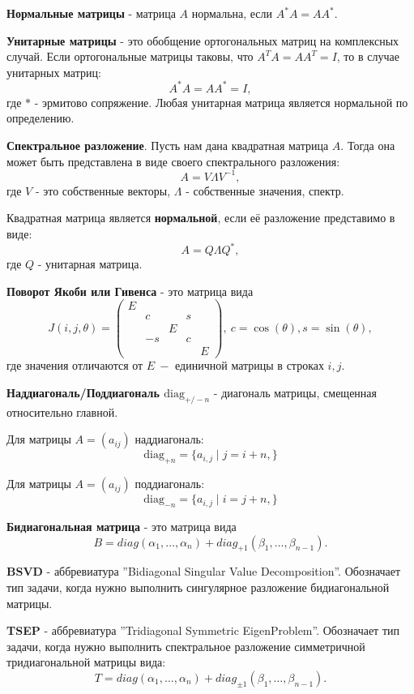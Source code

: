 \textbf{Нормальные матрицы} - матрица \(A\) нормальна, если \(A^*A=AA^*\).

\textbf{Унитарные матрицы} - это обобщение ортогональных матриц на комплексных случай. Если ортогональные матрицы таковы, что \(A^TA=AA^T=I\), то в случае унитарных матриц:
\[A^*A=AA^*=I,\]
где \(*\) - эрмитово сопряжение. Любая унитарная матрица является нормальной по определению.

\textbf{Спектральное разложение}. Пусть нам дана квадратная матрица \(A\). Тогда она может быть представлена в виде своего спектрального разложения:
\[ A=V\Lambda V^{-1},\]
 где \(V\) - это собственные векторы, \(\Lambda\) - собственные значения, спектр.

Квадратная матрица является \textbf{нормальной}, если её разложение представимо в виде:
\[A=Q \Lambda Q^*,\]
где \(Q\) - унитарная матрица. 

\textbf{Поворот Якоби или Гивенса} - это матрица вида
\[ \label{eq:2:1}
    J(i,j,\theta) = 
    \begin{pmatrix}E&&&&\\
        &c&&s\\
        &&E&&\\
        &-s&&c\\
        &&&&E
    \end{pmatrix},\
    c = \cos(\theta), s =\sin(\theta), 
\]
где значения отличаются от \(E\ - \) единичной матрицы в строках \(i, j\).

\textbf{Наддиагональ/Поддиагональ $\mathrm{diag}_{+/-n}$} - диагональ матрицы, смещенная относительно главной.

Для матрицы $A = (a_{ij})$ наддиагональ:
\begin{equation}
    \mathrm{diag}_{+n} = \{a_{i,j} \mid j = i + n,\}
\end{equation}
   
Для матрицы $A = (a_{ij})$ поддиагональ:
\begin{equation}
    \mathrm{diag}_{-n} = \{a_{i,j} \mid i = j + n,\}
\end{equation}
   

\textbf{Бидиагональная матрица} - это матрица вида
\[
        B= diag(\alpha_1,\dots,\alpha_n)+diag_{+1}(\beta_1,\dots,\beta_{n-1}).
\]

\textbf{BSVD} - аббревиатура ''Bidiagonal Singular Value Decomposition''. Обозначает тип задачи, когда нужно выполнить сингулярное разложение бидиагональной матрицы.

\textbf{TSEP} - аббревиатура ''Tridiagonal Symmetric EigenProblem''. Обозначает тип задачи, когда нужно выполнить спектральное разложение симметричной тридиагональной матрицы вида:
\[
        T= diag(\alpha_1,\dots,\alpha_n)+diag_{\pm1}(\beta_1,\dots,\beta_{n-1}).
\]

